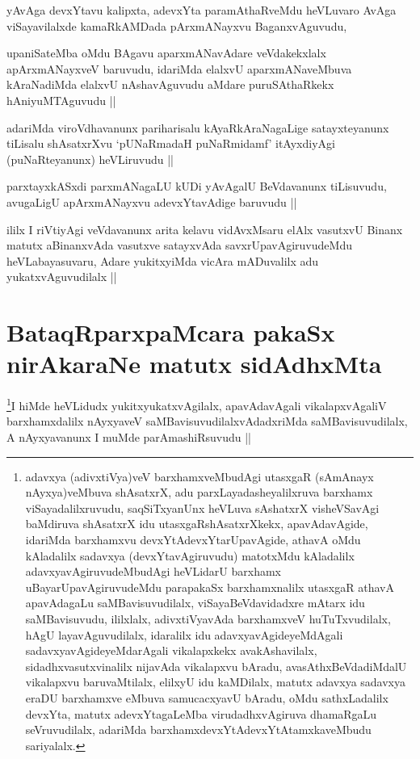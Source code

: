 \begin{artha}
yAvAga devxYtavu kalipxta, adevxYta paramAthaRveMdu heVLuvaro AvAga viSayavilalxde kamaRkAMDada pArxmANayxvu BaganxvAguvudu, 
\end{artha}

\begin{artha}
upaniSateMba oMdu BAgavu aparxmANavAdare veVdakekxlalx apArxmANayxveV baruvudu, idariMda elalxvU aparxmANaveMbuva kAraNadiMda elalxvU nAshavAguvudu aMdare puruSAthaRkekx hAniyuMTAguvudu ||
\end{artha}

\begin{artha}
adariMda viroVdhavanunx pariharisalu kAyaRkAraNagaLige satayxteyanunx tiLisalu shAsatxrXvu `pUNaRmadaH puNaRmidamf' itAyxdiyAgi (puNaRteyanunx) heVLiruvudu ||
\end{artha}

\begin{artha}
parxtayxkASxdi parxmANagaLU kUDi yAvAgalU BeVdavanunx tiLisuvudu, avugaLigU apArxmANayxvu adevxYtavAdige baruvudu ||
\end{artha}


\begin{artha}
ililx I riVtiyAgi veVdavanunx arita kelavu vidAvxMsaru elAlx vasutxvU Binanx matutx aBinanxvAda vasutxve satayxvAda savxrUpavAgiruvudeMdu heVLabayasuvaru, Adare yukitxyiMda vicAra mADuvalilx adu yukatxvAguvudilalx ||
\end{artha}

\section*{BataqRparxpaMcara pakaSx nirAkaraNe matutx sidAdhxMta}

\begin{artha}
\footnote{adavxya (adivxtiVya)veV barxhamxveMbudAgi utasxgaR (sAmAnayx nAyxya)veMbuva shAsatxrX, adu parxLayadasheyalilxruva barxhamx viSayadalilxruvudu, saqSiTxyanUnx heVLuva sAshatxrX visheVSavAgi baMdiruva shAsatxrX idu utasxgaRshAsatxrXkekx, apavAdavAgide, idariMda barxhamxvu devxYtAdevxYtarUpavAgide, athavA oMdu kAladalilx sadavxya (devxYtavAgiruvudu) matotxMdu kAladalilx adavxyavAgiruvudeMbudAgi heVLidarU barxhamx uBayarUpavAgiruvudeMdu parapakaSx barxhamxnalilx utasxgaR athavA apavAdagaLu saMBavisuvudilalx, viSayaBeVdavidadxre mAtarx idu saMBavisuvudu, ililxlalx, adivxtiVyavAda barxhamxveV huTuTxvudilalx, hAgU layavAguvudilalx, idaralilx idu adavxyavAgideyeMdAgali sadavxyavAgideyeMdarAgali vikalapxkekx avakAshavilalx, sidadhxvasutxvinalilx nijavAda vikalapxvu bAradu, avasAthxBeVdadiMdalU vikalapxvu baruvaMtilalx, elilxyU idu kaMDilalx, matutx adavxya sadavxya eraDU barxhamxve eMbuva samucacxyavU bAradu, oMdu sathxLadalilx devxYta, matutx adevxYtagaLeMba virudadhxvAgiruva dhamaRgaLu seVruvudilalx, adariMda barxhamxdevxYtAdevxYtAtamxkaveMbudu sariyalalx.}I hiMde heVLidudx yukitxyukatxvAgilalx, apavAdavAgali vikalapxvAgaliV barxhamxdalilx nAyxyaveV saMBavisuvudilalxvAdadxriMda saMBavisuvudilalx, A nAyxyavanunx I muMde parAmashiRsuvudu ||
\end{artha}

